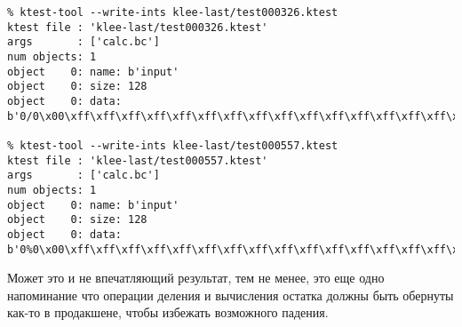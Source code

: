 \begin{lstlisting}
% ktest-tool --write-ints klee-last/test000326.ktest
ktest file : 'klee-last/test000326.ktest'
args       : ['calc.bc']
num objects: 1
object    0: name: b'input'
object    0: size: 128
object    0: data: b'0/0\x00\xff\xff\xff\xff\xff\xff\xff\xff\xff\xff\xff\xff\xff\xff\xff\xff\xff\xff\xff\xff\xff\xff\xff\xff\xff\xff\xff\xff\xff\xff\xff\xff\xff\xff\xff\xff\xff\xff\xff\xff\xff\xff\xff\xff\xff\xff\xff\xff\xff\xff\xff\xff\xff\xff\xff\xff\xff\xff\xff\xff\xff\xff\xff\xff\xff\xff\xff\xff\xff\xff\xff\xff\xff\xff\xff\xff\xff\xff\xff\xff\xff\xff\xff\xff\xff\xff\xff\xff\xff\xff\xff\xff\xff\xff\xff\xff\xff\xff\xff\xff\xff\xff\xff\xff\xff\xff\xff\xff\xff\xff\xff\xff\xff\xff\xff\xff\xff\xff\xff\xff\xff\xff\xff\xff'

% ktest-tool --write-ints klee-last/test000557.ktest
ktest file : 'klee-last/test000557.ktest'
args       : ['calc.bc']
num objects: 1
object    0: name: b'input'
object    0: size: 128
object    0: data: b'0%0\x00\xff\xff\xff\xff\xff\xff\xff\xff\xff\xff\xff\xff\xff\xff\xff\xff\xff\xff\xff\xff\xff\xff\xff\xff\xff\xff\xff\xff\xff\xff\xff\xff\xff\xff\xff\xff\xff\xff\xff\xff\xff\xff\xff\xff\xff\xff\xff\xff\xff\xff\xff\xff\xff\xff\xff\xff\xff\xff\xff\xff\xff\xff\xff\xff\xff\xff\xff\xff\xff\xff\xff\xff\xff\xff\xff\xff\xff\xff\xff\xff\xff\xff\xff\xff\xff\xff\xff\xff\xff\xff\xff\xff\xff\xff\xff\xff\xff\xff\xff\xff\xff\xff\xff\xff\xff\xff\xff\xff\xff\xff\xff\xff\xff\xff\xff\xff\xff\xff\xff\xff\xff\xff\xff\xff'
\end{lstlisting}

Может это и не впечатляющий результат, тем не менее, это еще одно напоминание что операции деления и вычисления остатка должны быть обернуты как-то в продакшене, чтобы избежать возможного падения.

